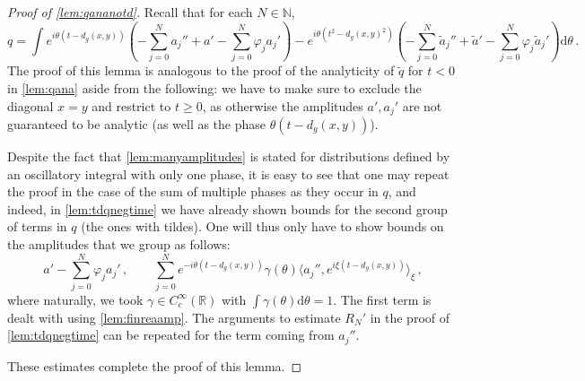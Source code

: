 \documentclass[
	fontsize=11pt, 
	twoside=false, 
	abstract=true, 
	a4paper,
]{scrartcl}
\newcommand{\RR}{\mathbb{R}}
\newcommand{\dd}{\mathrm{d}}
\newcommand{\del}{\partial}
\newcommand{\td}[1]{\tilde{#1}}
\newcommand{\bsc}[1]{\textbf{\ebgaramond\textsc{#1}}}
\begin{document}
\begin{proof}[Proof of \cref{lem:qananotd}]
	Recall that for each $N\in\mathbb{N}$,
	\[
	q = \int e^{i\theta(t-d_g(x,y))}\left(-\sum_{j=0}^Na_j'' +a' - \sum_{j=0}^N \varphi_j a_j'\right) - e^{i\theta(t^2-d_g(x,y)^2)}\left(-\sum_{j=0}^N\td{a}_j'' +\td{a}' - \sum_{j=0}^N\varphi_j\td{a}_j'\right)\dd\theta\,.
	\]
	The proof of this lemma is analogous to the proof of the analyticity of $\td{q}$ for $t<0$ in \cref{lem:qana} aside from the following: 
	we have to make sure to exclude the diagonal $x=y$ and restrict to $t\geq 0$, as otherwise the amplitudes $a',a_j'$ are not guaranteed to be analytic (as well as the phase $\theta (t-d_g(x,y))$). 

	Despite the fact that \cref{lem:manyamplitudes} is stated for distributions defined by an oscillatory integral with only one phase, it is easy to see that one may repeat the proof in the case of the sum of multiple phases as they occur in $q$, and indeed, in \cref{lem:tdqnegtime} we have already shown bounds for the second group of terms in $q$ (the ones with tildes). One will thus only have to show bounds on the amplitudes that we group as follows:
	\[
		a' - \sum_{j=0}^N \varphi_j a_j'\,,\qquad  \sum_{j=0}^Ne^{-i\theta(t-d_g(x,y))}\gamma(\theta)\langle a_j'', e^{i\xi(t-d_g(x,y))}\rangle_\xi\,,
	\]
	where naturally, we took $\gamma \in C_c^\infty(\RR)$ with $\int \gamma(\theta) \dd\theta = 1$. The first term is dealt with using \cref{lem:finreaamp}. The arguments to estimate $R_N'$ in the proof of \cref{lem:tdqnegtime} can be repeated for the term coming from $a_j''$. %

	These estimates complete the proof of this lemma.
%
%
\end{proof}
\end{document}
